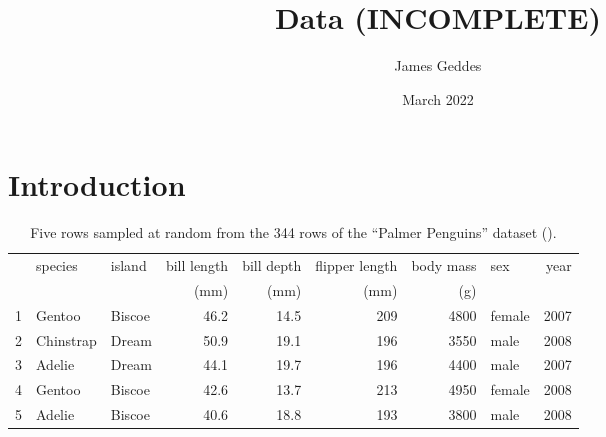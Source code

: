 \documentclass[10pt, a4paper, twocolumn]{article}
\author{James Geddes}
\date{March 2022}
\title{Data (INCOMPLETE)}
\begin{document}
\maketitle
\tableofcontents
\section{Introduction}
\begin{table*}[!ht]
\centering\small
\begin{tabular}{@{}rllrrrrlr@{}}
  \toprule
 & species & island & bill length & bill depth & flipper length & body mass & sex & year \\ 
 & & & (mm) & (mm) & (mm) & (g) & &  \\ 
  \midrule
  1 & Gentoo & Biscoe & 46.2 & 14.5 & 209 & 4800 & female & 2007 \\ 
  2 & Chinstrap & Dream & 50.9 & 19.1 & 196 & 3550 & male & 2008 \\ 
  3 & Adelie & Dream & 44.1 & 19.7 & 196 & 4400 & male & 2007 \\ 
  4 & Gentoo & Biscoe & 42.6 & 13.7 & 213 & 4950 & female & 2008 \\ 
  5 & Adelie & Biscoe & 40.6 & 18.8 & 193 & 3800 & male & 2008 \\ 
  \bottomrule
\end{tabular}
\caption{Five rows sampled at random from the 344 rows of the ``Palmer Penguins''
  dataset (\cite{palmerpenguins}).\label{tbl:penguins}}
\end{table*}
\end{document}
